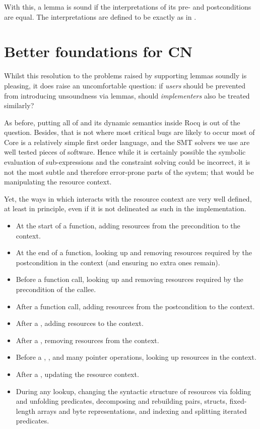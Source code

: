 With this, a lemma is sound if the interpretations of its pre- and
postconditions are equal. The interpretations are defined to be exactly as in
.

\section{Better foundations for CN}\label{sec:better-foundations}

Whilst this resolution to the problems raised by supporting lemmas soundly is
pleasing, it does raise an uncomfortable question: if  \emph{users}
should be prevented from introducing unsoundness via lemmas, should 
\emph{implementers} also be treated similarly?

As before, putting all of  and its dynamic semantics inside Rocq is
out of the question. Besides, that is not where most critical bugs are likely
to occur \textemdash{} most of Core is a relatively simple first order
language, and the SMT solvers we use are well tested pieces of software. Hence
while it is certainly possible the symbolic evaluation of sub-expressions and
the constraint solving could be incorrect, it is not the most subtle and
therefore error-prone parts of the system; that would be manipulating the
resource context.

Yet, the ways in which  interacts with the resource context are very
well defined, at least in principle, even if it is not delineated as such in
the implementation.
\begin{itemize}
    \item At the start of a function, adding resources from the precondition to
        the context.
    \item At the end of a function, looking up and removing resources required
        by the postcondition in the context (and ensuring no extra ones remain).
    \item Before a function call, looking up and removing resources required
        by the precondition of the callee.
    \item After a function call, adding resources from the postcondition to the
        context.
    \item After a , adding resources to the context.
    \item After a , removing resources from the context.
    \item Before a , , 
        and many pointer operations, looking up resources in the context.
    \item After a , updating the resource context.
    \item During any lookup, changing the syntactic structure of resources via
        folding and unfolding predicates, decomposing and rebuilding pairs,
        structs, fixed-length arrays and byte representations, and indexing and
        splitting iterated predicates.
\end{itemize}

